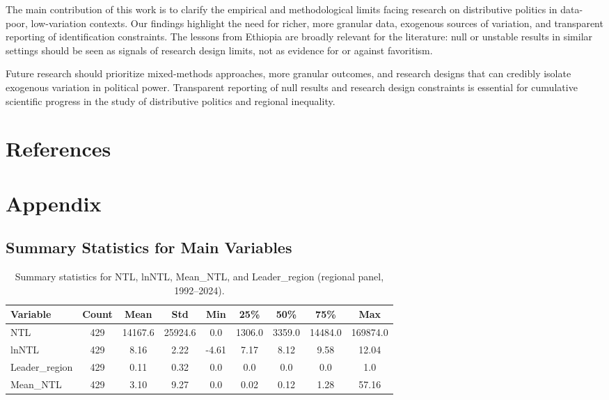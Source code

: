 \documentclass[12pt,a4paper]{article}
\begin{document}
The main contribution of this work is to clarify the empirical and methodological limits facing research on distributive politics in data-poor, low-variation contexts. Our findings highlight the need for richer, more granular data, exogenous sources of variation, and transparent reporting of identification constraints. The lessons from Ethiopia are broadly relevant for the literature: null or unstable results in similar settings should be seen as signals of research design limits, not as evidence for or against favoritism.

Future research should prioritize mixed-methods approaches, more granular outcomes, and research designs that can credibly isolate exogenous variation in political power. Transparent reporting of null results and research design constraints is essential for cumulative scientific progress in the study of distributive politics and regional inequality.

\section{References}



\section{Appendix}

\subsection*{Summary Statistics for Main Variables}
\begin{table}[ht]
\centering
\caption{Summary statistics for NTL, lnNTL, Mean\_NTL, and Leader\_region (regional panel, 1992--2024).}
\begin{tabular}{lcccccccc}
\toprule
Variable & Count & Mean & Std & Min & 25\% & 50\% & 75\% & Max \\
\midrule
NTL & 429 & 14167.6 & 25924.6 & 0.0 & 1306.0 & 3359.0 & 14484.0 & 169874.0 \\
lnNTL & 429 & 8.16 & 2.22 & -4.61 & 7.17 & 8.12 & 9.58 & 12.04 \\
Leader\_region & 429 & 0.11 & 0.32 & 0.0 & 0.0 & 0.0 & 0.0 & 1.0 \\
Mean\_NTL & 429 & 3.10 & 9.27 & 0.0 & 0.02 & 0.12 & 1.28 & 57.16 \\
\bottomrule
\end{tabular}
\label{tab:summary_stats}
\end{table}
\end{document}
